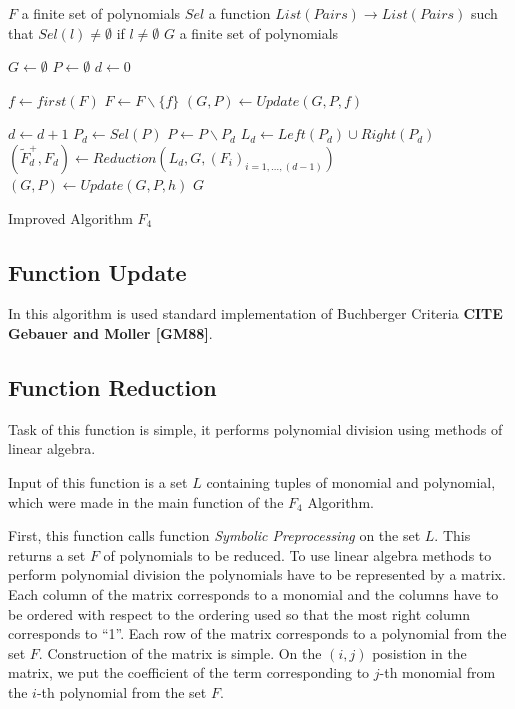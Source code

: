 \begin{algorithm}[ht]
  \begin{algorithmic}[1]
    \Require
      \Statex $F$ a finite set of polynomials
      \Statex $Sel$ a function $List(Pairs) \to List(Pairs)$ such that $Sel(l) \neq \emptyset$ if $l\neq\emptyset$
    \Ensure
      \Statex $G$ a finite set of polynomials
      \Statex

    \State $G \gets \emptyset$
    \State $P \gets \emptyset$
    \State $d \gets 0$

      \State $f \gets first(F)$
      \State $F \gets F\backslash \{f\}$
      \State $(G, P) \gets Update(G, P, f)$
    \EndWhile
    
      \State $d \gets d + 1$
      \State $P_d \gets Sel(P)$
      \State $P \gets P\backslash P_d$
      \State $L_d \gets Left(P_d) \cup Right(P_d)$
      \State $(\tilde{F}^+_d, F_d) \gets Reduction(L_d, G, (F_i)_{i=1,\ldots,(d-1)})$
        \State $(G, P) \gets Update(G, P, h)$
      \EndFor
    \EndWhile
    \State \Return $G$

  \end{algorithmic}
  \caption{Improved Algorithm $F_4$}
\end{algorithm}

\subsection{Function Update}
In this algorithm is used standard implementation of Buchberger Criteria \textbf{CITE Gebauer and Moller [GM88]}.

\subsection{Function Reduction}
Task of this function is simple, it performs polynomial division using methods of linear algebra.

Input of this function is a set $L$ containing tuples of monomial and polynomial, which were made in the main function of the $F_4$ Algorithm.

First, this function calls function \textit{Symbolic Preprocessing} on the set $L$. This returns a set $F$ of polynomials to be reduced. To use linear algebra methods to perform polynomial division the polynomials have to be represented by a matrix. Each column of the matrix corresponds to a monomial and the columns have to be ordered with respect to the ordering used so that the most right column corresponds to ``1''. Each row of the matrix corresponds to a polynomial from the set $F$. Construction of the matrix is simple. On the $(i, j)$ posistion in the matrix, we put the coefficient of the term corresponding to $j$-th monomial from the $i$-th polynomial from the set $F$.

